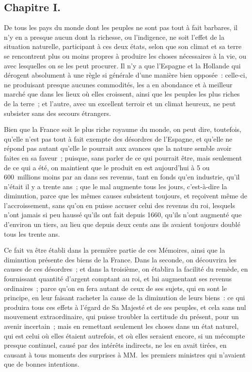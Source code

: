 \documentclass[french,twoside]{book} %
\begin{document}
\subsection[{Chapitre I.}]{Chapitre I.}
\noindent De tous les pays du monde dont les peuples ne sont pas tout à fait barbares, il n’y en a presque aucun dont la richesse, ou l’indigence, ne soit l’effet de la situation naturelle, participant à ces deux états, selon que son climat et sa terre se rencontrent plus ou moins propres à produire les choses nécessaires à la vie, ou avec lesquelles on se les peut procurer. Il n’y a que l’Espagne et la Hollande qui dérogent absolument à une règle si générale d’une manière bien opposée : celle-ci, ne produisant presque aucunes commodités, les a en abondance et à meilleur marché que dans les lieux où elles croissent, ainsi que les peuples les plus riches de la terre ; et l’autre, avec un excellent terroir et un climat heureux, ne peut subsister sans des secours étrangers.\par
Bien que la France soit le plus riche royaume du monde, on peut dire, toutefois, qu’elle n’est pas tout à fait exempte des désordres de l’Espagne, et qu’elle ne répond pas autant qu’elle le pourrait aux avances que la nature semble avoir faites en sa faveur ; puisque, sans parler de ce qui pourrait être, mais seulement de ce qui a été, on maintient que le produit en est aujourd’hui à 5 ou 600 millions moins par an dans ses revenus, tant en fonds qu’en industrie, qu’il n’était il y a trente ans ; que le mal augmente tous les jours, c’est-à-dire la diminution, parce que les mêmes causes subsistent toujours, et reçoivent même de l’accroissement, sans qu’on en puisse accuser celui des revenus du roi, lesquels n’ont jamais si peu haussé qu’ils ont fait depuis 1660, qu’ils n’ont augmenté que d’environ un tiers, au lieu que depuis deux cents ans ils avaient toujours doublé tous les trente ans.\par
Ce fait va être établi dans la première partie de ces Mémoires, ainsi que la diminution présente des biens de la France. Dans la seconde, on découvrira les causes de ces désordres ; et dans la troisième, on établira la facilité du remède, en fournissant quantité d’argent comptant au roi, et lui augmentant ses revenus ordinaires ; parce qu’on en fera autant de ceux de ses sujets, qui en sont le principe, en leur faisant racheter la cause de la diminution de leurs biens : ce qui produira tous ces effets à l’égard de Sa Majesté et de ses peuples, et cela sans nul mouvement extraordinaire, qui puisse troubler la certitude du présent, pour un avenir incertain ; mais en remettant seulement les choses dans un état naturel, qui est celui où elles étaient autrefois, et où elles seraient encore, si un mécompte presque continuel, causé par des intérêts indirects, ne les en avait tirées, en causant à tous moments des surprises à MM. les premiers ministres qui n’avaient que de bonnes intentions.
\end{document}
